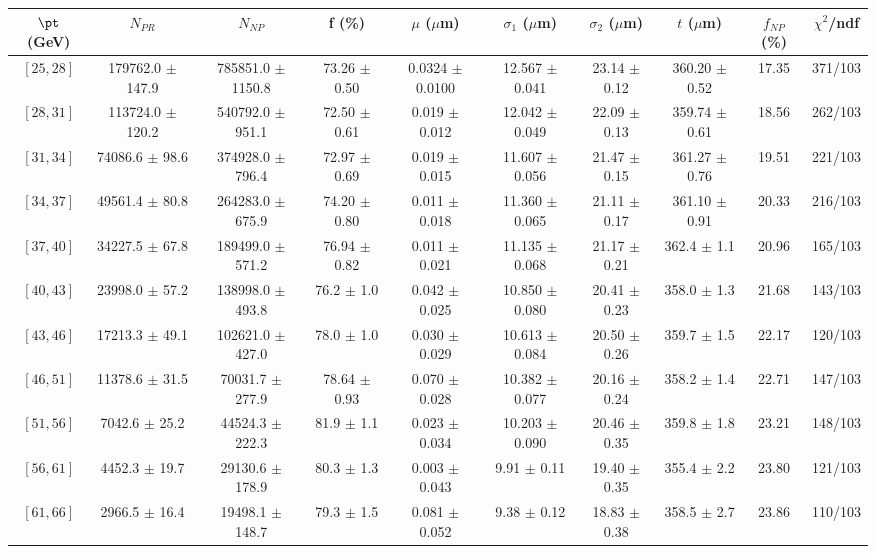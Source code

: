 \begin{tabular}{c||c|c|c|c|c|c|c||c|c}
$\pt$ (GeV) & $N_{PR}$ & $N_{NP}$ & f (\%) & $\mu$ ($\mu$m) & $\sigma_1$ ($\mu$m) & $\sigma_2$ ($\mu$m)  & $t$ ($\mu$m) & $f_{NP}$ (\%) & $\chi^2$/ndf \\
\hline
$[25, 28]$ & 179762.0 $\pm$ 147.9 & 785851.0 $\pm$ 1150.8 & 73.26 $\pm$ 0.50 & 0.0324 $\pm$ 0.0100 & 12.567 $\pm$ 0.041 & 23.14 $\pm$ 0.12 & 360.20 $\pm$ 0.52 & 17.35 & 371/103\\
$[28, 31]$ & 113724.0 $\pm$ 120.2 & 540792.0 $\pm$ 951.1 & 72.50 $\pm$ 0.61 & 0.019 $\pm$ 0.012 & 12.042 $\pm$ 0.049 & 22.09 $\pm$ 0.13 & 359.74 $\pm$ 0.61 & 18.56 & 262/103\\
$[31, 34]$ & 74086.6 $\pm$ 98.6 & 374928.0 $\pm$ 796.4 & 72.97 $\pm$ 0.69 & 0.019 $\pm$ 0.015 & 11.607 $\pm$ 0.056 & 21.47 $\pm$ 0.15 & 361.27 $\pm$ 0.76 & 19.51 & 221/103\\
$[34, 37]$ & 49561.4 $\pm$ 80.8 & 264283.0 $\pm$ 675.9 & 74.20 $\pm$ 0.80 & 0.011 $\pm$ 0.018 & 11.360 $\pm$ 0.065 & 21.11 $\pm$ 0.17 & 361.10 $\pm$ 0.91 & 20.33 & 216/103\\
$[37, 40]$ & 34227.5 $\pm$ 67.8 & 189499.0 $\pm$ 571.2 & 76.94 $\pm$ 0.82 & 0.011 $\pm$ 0.021 & 11.135 $\pm$ 0.068 & 21.17 $\pm$ 0.21 & 362.4 $\pm$ 1.1 & 20.96 & 165/103\\
$[40, 43]$ & 23998.0 $\pm$ 57.2 & 138998.0 $\pm$ 493.8 & 76.2 $\pm$ 1.0 & 0.042 $\pm$ 0.025 & 10.850 $\pm$ 0.080 & 20.41 $\pm$ 0.23 & 358.0 $\pm$ 1.3 & 21.68 & 143/103\\
$[43, 46]$ & 17213.3 $\pm$ 49.1 & 102621.0 $\pm$ 427.0 & 78.0 $\pm$ 1.0 & 0.030 $\pm$ 0.029 & 10.613 $\pm$ 0.084 & 20.50 $\pm$ 0.26 & 359.7 $\pm$ 1.5 & 22.17 & 120/103\\
$[46, 51]$ & 11378.6 $\pm$ 31.5 & 70031.7 $\pm$ 277.9 & 78.64 $\pm$ 0.93 & 0.070 $\pm$ 0.028 & 10.382 $\pm$ 0.077 & 20.16 $\pm$ 0.24 & 358.2 $\pm$ 1.4 & 22.71 & 147/103\\
$[51, 56]$ & 7042.6 $\pm$ 25.2 & 44524.3 $\pm$ 222.3 & 81.9 $\pm$ 1.1 & 0.023 $\pm$ 0.034 & 10.203 $\pm$ 0.090 & 20.46 $\pm$ 0.35 & 359.8 $\pm$ 1.8 & 23.21 & 148/103\\
$[56, 61]$ & 4452.3 $\pm$ 19.7 & 29130.6 $\pm$ 178.9 & 80.3 $\pm$ 1.3 & 0.003 $\pm$ 0.043 & 9.91 $\pm$ 0.11 & 19.40 $\pm$ 0.35 & 355.4 $\pm$ 2.2 & 23.80 & 121/103\\
$[61, 66]$ & 2966.5 $\pm$ 16.4 & 19498.1 $\pm$ 148.7 & 79.3 $\pm$ 1.5 & 0.081 $\pm$ 0.052 & 9.38 $\pm$ 0.12 & 18.83 $\pm$ 0.38 & 358.5 $\pm$ 2.7 & 23.86 & 110/103\\

\end{tabular}
